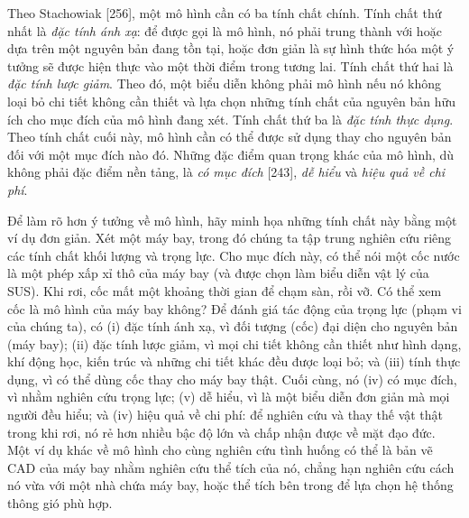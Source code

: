 Theo Stachowiak [256], một mô hình cần có ba tính chất chính. Tính chất thứ nhất là \emph{đặc tính ánh xạ}: để được gọi là mô hình, nó phải trung thành với hoặc dựa trên một nguyên bản đang tồn tại, hoặc đơn giản là sự hình thức hóa một ý tưởng sẽ được hiện thực vào một thời điểm trong tương lai. Tính chất thứ hai là \emph{đặc tính lược giảm}. Theo đó, một biểu diễn không phải mô hình nếu nó không loại bỏ chi tiết không cần thiết và lựa chọn những tính chất của nguyên bản hữu ích cho mục đích của mô hình đang xét. Tính chất thứ ba là \emph{đặc tính thực dụng}. Theo tính chất cuối này, mô hình cần có thể được sử dụng thay cho nguyên bản đối với một mục đích nào đó. Những đặc điểm quan trọng khác của mô hình, dù không phải đặc điểm nền tảng, là \emph{có mục đích} [243], \emph{dễ hiểu} và \emph{hiệu quả về chi phí}.

Để làm rõ hơn ý tưởng về mô hình, hãy minh họa những tính chất này bằng một ví dụ đơn giản. Xét một máy bay, trong đó chúng ta tập trung nghiên cứu riêng các tính chất khối lượng và trọng lực. Cho mục đích này, có thể nói một cốc nước là một phép xấp xỉ thô của máy bay (và được chọn làm biểu diễn vật lý của SUS). Khi rơi, cốc mất một khoảng thời gian để chạm sàn, rồi vỡ. Có thể xem cốc là mô hình của máy bay không? Để đánh giá tác động của trọng lực (phạm vi của chúng ta), có (i) đặc tính ánh xạ, vì đối tượng (cốc) đại diện cho nguyên bản (máy bay); (ii) đặc tính lược giảm, vì mọi chi tiết không cần thiết như hình dạng, khí động học, kiến trúc và những chi tiết khác đều được loại bỏ; và (iii) tính thực dụng, vì có thể dùng cốc thay cho máy bay thật. Cuối cùng, nó (iv) có mục đích, vì nhằm nghiên cứu trọng lực; (v) dễ hiểu, vì là một biểu diễn đơn giản mà mọi người đều hiểu; và (iv) hiệu quả về chi phí: để nghiên cứu và thay thế vật thật trong khi rơi, nó rẻ hơn nhiều bậc độ lớn và chấp nhận được về mặt đạo đức. Một ví dụ khác về mô hình cho cùng nghiên cứu tình huống có thể là bản vẽ CAD
của máy bay nhằm nghiên cứu thể tích của nó, chẳng hạn nghiên cứu cách nó vừa với một nhà chứa máy bay, hoặc thể tích bên trong để lựa chọn hệ thống thông gió phù hợp.

